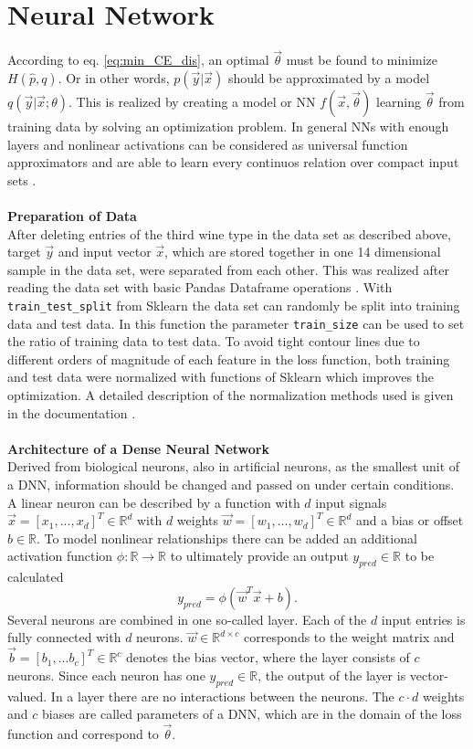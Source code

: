 \section{Neural Network}
According to eq. \ref{eq:min_CE_dis}, an optimal $\vec{\theta}$ must be found to minimize $H(\hat{p},q)$. Or in other words, $p(\vec{y}|\vec{x})$ should be approximated by a model $q(\vec{y}|\vec{x};\theta)$. This is realized by creating a model or NN $f(\vec{x},\vec{\theta})$ learning $\vec{\theta}$ from training data by solving an optimization problem. In general NNs with enough layers and nonlinear activations can be considered as universal function approximators \cite{Cybenko1989Dec} and are able to learn every continuos relation over compact input sets \cite{Hornik1991Jan}.
\\
\\
\textbf{Preparation of Data}\\
After deleting entries of the third wine type in the data set as described above, target $\vec{y}$ and input vector $\vec{x}$, which are stored together in one 14 dimensional sample in the data set, were separated from each other. This was realized after reading the data set with basic Pandas Dataframe operations \cite{reback2020pandas}. With \texttt{train\_test\_split} from Sklearn the data set can randomly be split into training data and test data. In this function the parameter \texttt{train\_size} can be used to set the ratio of training data to test data. To avoid tight contour lines due to different orders of magnitude of each feature in the loss function, both training and test data were normalized with functions of Sklearn which improves the optimization. A detailed description of the normalization methods used is given in the documentation \cite{SKLEARN_DOC}.\\
\\
\textbf{Architecture of a Dense Neural Network}\\
Derived from biological neurons, also in artificial neurons, as the smallest unit of a DNN, information should be changed and passed on under certain conditions. A linear neuron can be described by a function with $d$ input signals $\Vec{x} = [x_1, ... ,x_d]^T \in\mathbb{R}^d$ with $d$ weights $\Vec{w} = [w_1, ... , w_d]^T \in \mathbb{R}^d$ and a bias or offset $b \in \mathbb{R}$. To model nonlinear relationships there can be added an additional activation function $\phi: \mathbb{R} \rightarrow \mathbb{R}$ to ultimately provide an output $y_{pred} \in \mathbb{R}$ to be calculated
\begin{equation}
    y_{pred} = \phi(\Vec{w}^T\Vec{x}+b).
\end{equation}
Several neurons are combined in one so-called layer. Each of the $d$ input entries is fully connected with $d$ neurons. $\Vec{w} \in\mathbb{R}^{d\times c}$ corresponds to the weight matrix and $\Vec{b}=[b_1, ... b_c]^T \in \mathbb{R}^c$ denotes the bias vector, where the layer consists of $c$ neurons. Since each neuron has one $y_{pred} \in \mathbb{R}$, the output of the layer is vector-valued. In a layer there are no interactions between the neurons. The $c\cdot d$ weights and $c$ biases are called parameters of a DNN, which are in the domain of the loss function and correspond to $\vec{\theta}$.

